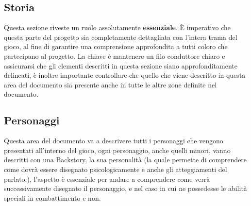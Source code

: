 \documentclass{report}
\begin{document}
\subsection{Storia}

Questa sezione riveste un ruolo assolutamente \textbf{essenziale}. È imperativo che questa parte del progetto sia completamente dettagliata con l'intera trama del gioco, al fine di garantire una comprensione approfondita a tutti coloro che partecipano al progetto. La chiave è mantenere un filo conduttore chiaro e assicurarsi che gli elementi descritti in questa sezione siano approfonditamente delineati, è inoltre importante controllare che quello che viene descritto in questa area del documento sia presente anche in tutte le altre zone definite nel documento.

\subsection{Personaggi}

Questa area del documento va a descrivere tutti i personaggi che vengono presentati all'interno del gioco, ogni personaggio, anche quelli minori, vanno descritti con una Backstory, la sua personalità (la quale permette di comprendere come dovrà essere disegnato psicologicamente e anche gli atteggiamenti del parlato.), l'aspetto è essenziale per andare a comprendere come verrà successivamente disegnato il personaggio, e nel caso in cui ne possedesse le abilità speciali in combattimento e non.
\end{document}
